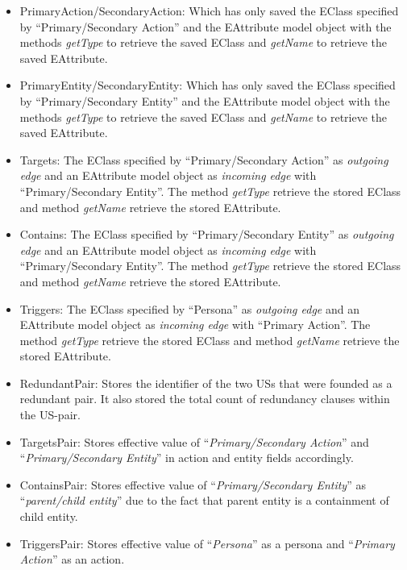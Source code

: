 \begin{itemize}
	
	\item PrimaryAction/SecondaryAction: Which has only saved the EClass specified by \enquote{Primary/Secondary Action} and the EAttribute model object with the methods \textit{getType} to retrieve the saved EClass and \textit{getName} to retrieve the saved EAttribute.
	
	\item PrimaryEntity/SecondaryEntity: Which has only saved the EClass specified by \enquote{Primary/Secondary Entity} and the EAttribute model object with the methods \textit{getType} to retrieve the saved EClass and \textit{getName} to retrieve the saved EAttribute.
	
	\item Targets: The EClass specified by \enquote{Primary/Secondary Action} as \textit{outgoing edge} and an EAttribute model object as \textit{incoming edge} with \enquote{Primary/Secondary Entity}. The method \textit{getType} retrieve the stored EClass and method \textit{getName} retrieve the stored EAttribute.
	
	\item Contains: The EClass specified by \enquote{Primary/Secondary Entity} as \textit{outgoing edge} and an EAttribute model object as \textit{incoming edge} with \enquote{Primary/Secondary Entity}. The method \textit{getType} retrieve the stored EClass and method \textit{getName} retrieve the stored EAttribute.
	
	\item Triggers: The EClass specified by \enquote{Persona} as \textit{outgoing edge} and an EAttribute model object as \textit{incoming edge} with \enquote{Primary Action}. The method \textit{getType} retrieve the stored EClass and method \textit{getName} retrieve the stored EAttribute.
	
	\item RedundantPair: Stores the identifier of the two USs that were founded as a redundant pair. It also stored the total count of redundancy clauses within the US-pair.
	
	\item TargetsPair: Stores effective value of \enquote{\textit{Primary/Secondary Action}} and \enquote{\textit{Primary/Secondary Entity}} in action and entity fields accordingly.
	
	\item ContainsPair: Stores effective value of \enquote{\textit{Primary/Secondary Entity}} as \enquote{\textit{parent/child entity}} due to the fact that parent entity is a containment of child entity.
	
	\item TriggersPair: Stores effective value of \enquote{\textit{Persona}} as a persona and \enquote{\textit{Primary Action}} as an action.
	
\end{itemize}
